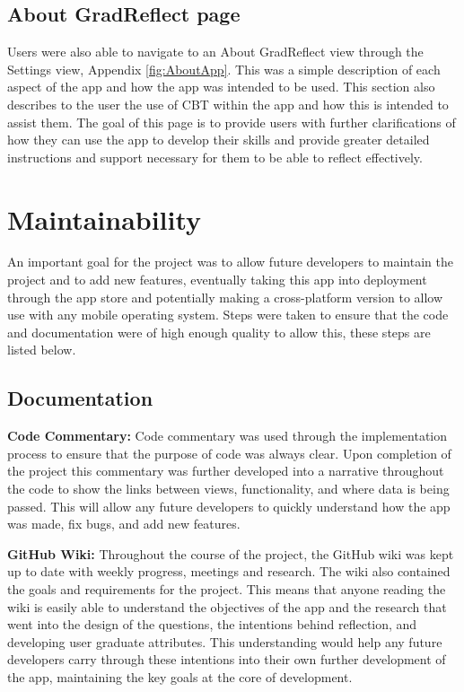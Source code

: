 \documentclass{l4proj}
\begin{document}
\subsection{About GradReflect page}

Users were also able to navigate to an About GradReflect view through the Settings view, Appendix \ref{fig:AboutApp}. This was a simple description of each aspect of the app and how the app was intended to be used. This section also describes to the user the use of CBT within the app and how this is intended to assist them. The goal of this page is to provide users with further clarifications of how they can use the app to develop their skills and provide greater detailed instructions and support necessary for them to be able to reflect effectively. 


\section{Maintainability}
An important goal for the project was to allow future developers to maintain the project and to add new features, eventually taking this app into deployment through the app store and potentially making a cross-platform version to allow use with any mobile operating system. Steps were taken to ensure that the code and documentation were of high enough quality to allow this, these steps are listed below.

\subsection{Documentation}

\textbf{Code Commentary:} Code commentary was used through the implementation process to ensure that the purpose of code was always clear. Upon completion of the project this commentary was further developed into a narrative throughout the code to show the links between views, functionality, and where data is being passed. This will allow any future developers to quickly understand how the app was made, fix bugs, and add new features.

\textbf{GitHub Wiki:} Throughout the course of the project, the GitHub wiki was kept up to date with weekly progress, meetings and research. The wiki also contained the goals and requirements for the project. This means that anyone reading the wiki is easily able to understand the objectives of the app and the research that went into the design of the questions, the intentions behind reflection, and developing user graduate attributes. This understanding would help any future developers carry through these intentions into their own further development of the app, maintaining the key goals at the core of development. 
\end{document}
